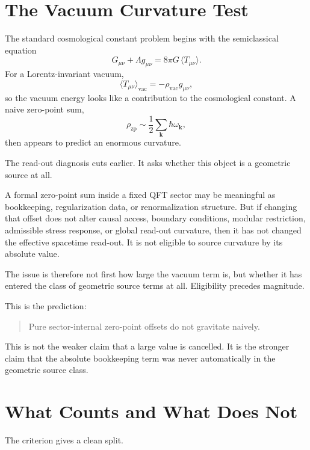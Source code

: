 \documentclass[12pt,a4paper]{article}
\theoremstyle{definition}
\theoremstyle{remark}
\begin{document}
\section{The Vacuum Curvature Test}
\label{sec:vacuum-test}

The standard cosmological constant problem begins with the semiclassical equation
\[
G_{\mu\nu}+\Lambda g_{\mu\nu}=8\pi G\,\langle T_{\mu\nu}\rangle .
\]
For a Lorentz-invariant vacuum,
\[
\langle T_{\mu\nu}\rangle_{\mathrm{vac}}=-\rho_{\mathrm{vac}}g_{\mu\nu},
\]
so the vacuum energy looks like a contribution to the cosmological constant. A naive zero-point sum,
\[
\rho_{\mathrm{zp}}\sim \frac{1}{2}\sum_{\mathbf{k}}\hbar\omega_{\mathbf{k}},
\]
then appears to predict an enormous curvature.

The read-out diagnosis cuts earlier. It asks whether this object is a geometric source at all.

A formal zero-point sum inside a fixed QFT sector may be meaningful as bookkeeping, regularization data, or renormalization structure. But if changing that offset does not alter causal access, boundary conditions, modular restriction, admissible stress response, or global read-out curvature, then it has not changed the effective spacetime read-out. It is not eligible to source curvature by its absolute value.

The issue is therefore not first how large the vacuum term is, but whether it has entered the class of geometric source terms at all. Eligibility precedes magnitude.

This is the prediction:

\begin{quote}
Pure sector-internal zero-point offsets do not gravitate naively.
\end{quote}

This is not the weaker claim that a large value is cancelled. It is the stronger claim that the absolute bookkeeping term was never automatically in the geometric source class.

\section{What Counts and What Does Not}
\label{sec:classification}

The criterion gives a clean split.
\end{document}
